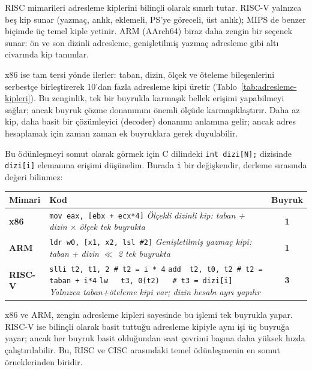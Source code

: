 \begin{karsilastirma}
RISC mimarileri adresleme kiplerini bilinçli olarak sınırlı tutar. RISC-V yalnızca beş kip sunar (yazmaç, anlık, eklemeli, PS'ye göreceli, üst anlık); MIPS de benzer biçimde üç temel kiple yetinir. ARM (AArch64) biraz daha zengin bir seçenek sunar: ön ve son dizinli adresleme, genişletilmiş yazmaç adresleme gibi altı civarında kip tanımlar.

x86 ise tam tersi yönde ilerler: taban, dizin, ölçek ve öteleme bileşenlerini serbestçe birleştirerek 10'dan fazla adresleme kipi üretir (Tablo~\ref{tab:adresleme-kipleri}). Bu zenginlik, tek bir buyrukla karmaşık bellek erişimi yapabilmeyi sağlar; ancak buyruk çözme donanımını önemli ölçüde karmaşıklaştırır. Daha az kip, daha basit bir çözümleyici (decoder) donanımı anlamına gelir; ancak adres hesaplamak için zaman zaman ek buyruklara gerek duyulabilir.

Bu ödünleşmeyi somut olarak görmek için C dilindeki \texttt{int dizi[N];} dizisinde \texttt{dizi[i]} elemanına erişimi düşünelim. Burada \texttt{i} bir değişkendir, derleme sırasında değeri bilinmez:

\begin{center}
\small
\begin{tabular}{lp{9.5cm}c}
\toprule
\textbf{Mimari} & \textbf{Kod} & \textbf{Buyruk} \\
\midrule
\textbf{x86} & \texttt{mov eax, [ebx + ecx*4]} \newline \textit{Ölçekli dizinli kip: taban + dizin $\times$ ölçek tek buyrukta} & \textbf{1} \\
\midrule
\textbf{ARM} & \texttt{ldr w0, [x1, x2, lsl \#2]} \newline \textit{Genişletilmiş yazmaç kipi: taban + dizin $\ll$ 2 tek buyrukta} & \textbf{1} \\
\midrule
\textbf{RISC-V} & \texttt{slli t2, t1, 2 \quad \# t2 = i * 4} \newline \texttt{add ~t2, t0, t2 \quad \# t2 = taban + i*4} \newline \texttt{lw ~~t3, 0(t2) ~~\quad \# t3 = dizi[i]} \newline \textit{Yalnızca taban+öteleme kipi var; dizin hesabı ayrı yapılır} & \textbf{3} \\
\bottomrule
\end{tabular}
\end{center}

x86 ve ARM, zengin adresleme kipleri sayesinde bu işlemi tek buyrukla yapar. RISC-V ise bilinçli olarak basit tuttuğu adresleme kipiyle aynı işi üç buyruğa yayar; ancak her buyruk basit olduğundan saat çevrimi başına daha yüksek hızda çalıştırılabilir. Bu, RISC ve CISC arasındaki temel ödünleşmenin en somut örneklerinden biridir.
\end{karsilastirma}

